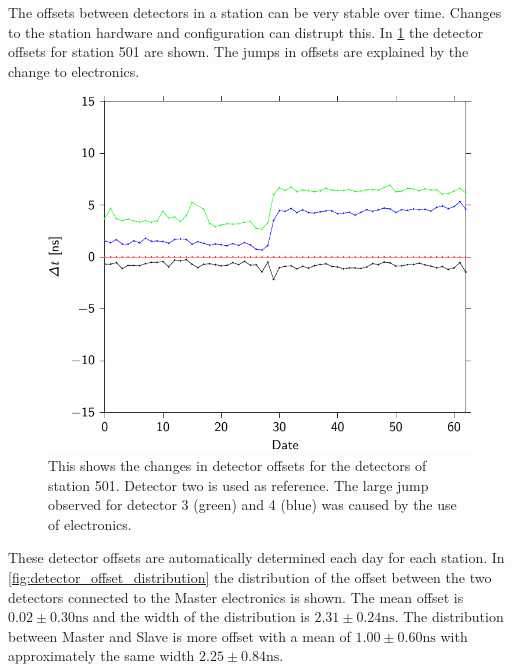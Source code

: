 The offsets between detectors in a station can be very stable over time. Changes to the station hardware and configuration can distrupt this. In \cref{fig:detector_offset_drift_month_501} the detector offsets for station 501 are shown. The jumps in offsets are explained by the change to \hisparciii electronics.

\begin{figure}
    \centering
    \includegraphics{plots/station/detector_offset_drift_month_501}
    \caption{This shows the changes in detector offsets for the detectors of station 501. Detector two is used as reference. The large jump observed for detector 3 (green) and 4 (blue) was caused by the use of \hisparciii electronics.}
    \label{fig:detector_offset_drift_month_501}
\end{figure}

These detector offsets are automatically determined each day for each station. In \cref{fig:detector_offset_distribution} the distribution of the offset between the two detectors connected to the Master electronics is shown. The mean offset is $0.02 \pm 0.30 \si{\ns}$ and the width of the distribution is $2.31 \pm 0.24 \si{\ns}$. The distribution between Master and Slave is more offset with a mean of $1.00 \pm 0.60 \si{\ns}$ with approximately the same width $2.25 \pm 0.84 \si{\ns}$.

